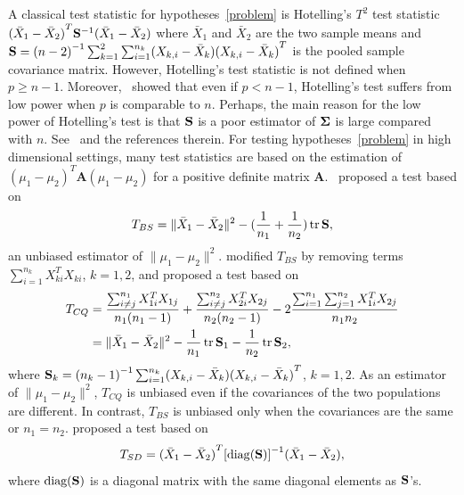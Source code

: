 \documentclass[review]{elsarticle}
\DeclareMathOperator{\mytr}{tr}
\newcommand{\BA}{\mathbf{A}}    \newcommand{\BB}{\mathbf{B}}    \newcommand{\BC}{\mathbf{C}}    \newcommand{\BD}{\mathbf{D}}    \newcommand{\BE}{\mathbf{E}}    \newcommand{\BF}{\mathbf{F}}    \newcommand{\BG}{\mathbf{G}}    \newcommand{\BH}{\mathbf{H}}    \newcommand{\BI}{\mathbf{I}}    \newcommand{\BJ}{\mathbf{J}}    \newcommand{\BK}{\mathbf{K}}    \newcommand{\BL}{\mathbf{L}}
\theoremstyle{plain}
\theoremstyle{definition}
\theoremstyle{remark}
\begin{document}
A classical test statistic for hypotheses~\eqref{problem} is Hotelling's $T^2$ test  statistic ${(\bar{X}_1-\bar{X}_2)}^T \mathbf{S}^{-1}(\bar{X}_1-\bar{X}_2)$ where $\bar{X}_1$ and $\bar{X}_2$ are the two sample means and
    $
    \mathbf{S}=
{(n-2)}^{-1}\sum_{k=1}^2\sum_{i=1}^{n_k} (X_{k,i}-\bar{X}_k) {(X_{k,i}-\bar{X}_k)}^T
    $
is the pooled sample covariance matrix.
However, Hotelling's test statistic is not defined when $p\geq n-1$.
Moreover,~\cite{Bai1996Efiect} showed that even if $p<n-1$, Hotelling's test suffers from low power when $p$ is comparable to $n$.
Perhaps, the main reason for the low power of Hotelling's test is that $\mathbf{S}$ is a poor estimator of $\boldsymbol{\Sigma}$ is large compared with $n$.
See~\cite{Chen2010A} and the references therein.
For testing hypotheses~\eqref{problem} in high dimensional settings,  
many test statistics are based on the estimation of  ${(\mu_1-\mu_2)}^T \BA(\mu_1-\mu_2)$ for a positive definite matrix $\BA$.~\cite{Bai1996Efiect} proposed a test based on
\begin{equation*}
    T_{BS}=\|\bar{X}_1-\bar{X}_2\|^2-(\frac{1}{n_1}+\frac{1}{n_2})\mytr \BS,
\end{equation*}
an unbiased estimator of $\|\mu_1-\mu_2\|^2$.
\cite{Chen2010A} modified $T_{BS}$ by removing terms $\sum_{i=1}^{n_k}X_{ki}^T X_{ki}$, $k=1,2$, and proposed a test based on
\begin{equation*}
    \begin{aligned}
        T_{CQ}&=\frac{\sum_{i\neq j}^{n_1}X_{1i}^T X_{1j}}{n_1(n_1-1)}+\frac{\sum_{i\neq j}^{n_2}X_{2i}^T X_{2j}}{n_2(n_2-1)}-2\frac{\sum_{i=1}^{n_1}\sum_{j=1}^{n_2}X_{1i}^T X_{2j}}{n_1n_2}
        \\
            &=\|\bar{X}_1-\bar{X}_2\|^2-\frac{1}{n_1}\mytr \BS_1-\frac{1}{n_2}\mytr \BS_2,
    \end{aligned}
\end{equation*}
where
$\mathbf{S}_k={(n_k -1)}^{-1}\sum_{i=1}^{n_k} (X_{k,i}-\bar{X}_k) {(X_{k,i}-\bar{X}_k)}^T
$, $k=1,2$.
As an estimator of $\|\mu_1-\mu_2\|^2$, $T_{CQ}$ is unbiased even if the covariances of the two populations are different.
In contrast, $T_{BS}$ is unbiased only when the covariances are the same or $n_1=n_2$.
\cite{Srivastava2008A} proposed a test based on
\begin{equation*}
    T_{SD}={(\bar{X}_1-\bar{X}_2)}^T {[\mathrm{diag}(\mathbf{S})]}^{-1}(\bar{X}_1-\bar{X}_2),
\end{equation*}
where $\textrm{diag} (\mathbf{S})$ is a diagonal matrix with the same diagonal elements as $\mathbf{S}$'s.
\end{document}
